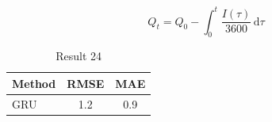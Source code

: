 \documentclass[11pt]{article}
\begin{document}
\begin{equation}\label{eq:24}
  Q_t = Q_0 - \int_0^t \frac{I(\tau)}{3600}\,\mathrm{d}\tau
\end{equation}
\begin{table}[h]\centering\begin{tabular}{lcc}\toprule Method & RMSE & MAE\\\midrule GRU & 1.2 & 0.9\\\bottomrule\end{tabular}\caption{Result 24}\end{table}



\end{document}
